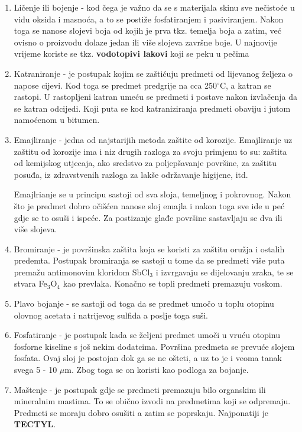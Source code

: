\documentclass[a4paper,12pt]{article}
\numberwithin{figure}{section}
\begin{document}
\begin{enumerate}
\item Ličenje ili bojenje - kod čega je važno da se s materijala skinu sve nečistoće u vidu oksida i masnoća, a to se postiže fosfatiranjem i pasiviranjem. Nakon toga se nanose slojevi boja od kojih je prva tkz. temelja boja a zatim, već ovisno o proizvodu dolaze jedan ili više slojeva završne boje. U najnovije vrijeme koriste se tkz. \textbf{vodotopivi lakovi} koji se peku u pečima
\item Katraniranje - je postupak kojim se zaštićuju predmeti od lijevanog željeza o napose cijevi. Kod toga se predmet predgrije na cca 250$^{\circ}$C, a katran se rastopi. U rastopljeni katran umeću se predmeti i postave nakon izvlačenja da se katran odcijedi. Koji puta se kod katraniziranja predmeti obaviju i jutom namoćenom u bitumen.
\item Emajliranje - jedna od najstarijih metoda zaštite od korozije. Emajliranje uz zaštitu od korozije ima i niz drugih razloga za svoju primjenu to su: zaštita od kemijskog utjecaja, ako sredstvo za poljepšavanje površine, za zaštitu posuđa, iz zdravstvenih razloga za lakše održavanje higijene, itd.\par
Emajlrianje se u principu sastoji od sva sloja, temeljnog i pokrovnog. Nakon što je predmet dobro očišćen nanose sloj emajla i nakon toga sve ide u peć gdje se to osuši i ispeće. Za postizanje glađe površine sastavljaju se dva ili više slojeva.
\item Bromiranje - je površinska zaštita koja se koristi za zaštitu oružja i ostalih predemta. Postupak bromiranja se sastoji u tome da se predmeti više puta premažu antimonovim kloridom SbCl$_{3}$ i izvrgavaju se dijelovanju zraka, te se stvara Fe$_{3}$O$_{4}$ kao prevlaka. Konačno se topli predmeti premazuju voskom.
\item Plavo bojanje - se sastoji od toga da se predmet umočo u toplu otopinu olovnog acetata i natrijevog sulfida a poslje toga suši.
\item Fosfatiranje - je postupak kada se željeni predmet umoči u vruću otopinu fosforne kiseline s još nekim dodatcima. Površina predmeta se prevuće slojem fosfata. Ovaj sloj je postojan dok ga se ne ošteti, a uz to je i veoma tanak svega 5 - 10 $\mu$m. Zbog toga se on koristi kao podloga za bojanje.
\item Maštenje - je postupak gdje se predmeti premazuju bilo organskim ili mineralnim mastima. To se obično izvodi na predmetima koji se odpremaju. Predmeti se moraju dobro osušiti a zatim se poprskaju. Najponatiji je \textbf{TECTYL}. 
\end{enumerate} 
\end{document}
